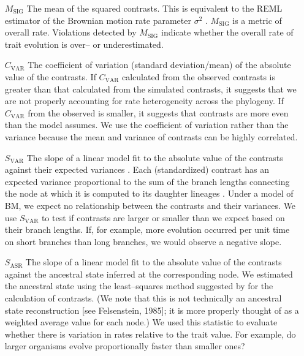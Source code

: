 \documentclass[a4paper,11pt]{article}
\begin{document}
\begin{enumerate}
\item[$M_{\text{SIG}}$] The mean of the squared contrasts. This is equivalent to the REML estimator of the Brownian motion rate parameter $\sigma^2$ \citep{Garland1992, Rohlf2001}. $M_{\text{SIG}}$ is a metric of overall rate. Violations detected by $M_{\text{SIG}}$ indicate whether the overall rate of trait evolution is over-- or underestimated.

\item[$C_{\text{VAR}}$] The coefficient of variation (standard deviation/mean) of the absolute value of the contrasts. If $C_{\text{VAR}}$ calculated from the observed contrasts is greater than that calculated from the simulated contrasts, it suggests that we are not properly accounting for rate heterogeneity across the phylogeny. If $C_{\text{VAR}}$ from the observed is smaller, it suggests that contrasts are more even than the model assumes. We use the coefficient of variation rather than the variance because the mean and variance of contrasts can be highly correlated.

\item[$S_{\text{VAR}}$] The slope of a linear model fit to the absolute value of the contrasts against their expected variances \citep[following][]{Garland1992}. Each (standardized) contrast has an expected variance proportional to the sum of the branch lengths connecting the node at which it is computed to its daughter lineages  \citep{Felsenstein1985}. Under a model of BM, we expect no relationship between the contrasts and their variances. We use $S_{\text{VAR}}$ to test if contrasts are larger or smaller than we expect based on their branch lengths. If, for example, more evolution occurred per unit time on short branches than long branches, we would observe a negative slope.

\item[$S_{\text{ASR}}$] The slope of a linear model fit to the absolute value of the contrasts against the ancestral state inferred at the corresponding node. We estimated the ancestral state using the least--squares method suggested by \citet{Felsenstein1985} for the calculation of contrasts. (We note that this is not technically an ancestral state reconstruction [see Felsenstein, 1985]; it is more properly thought of as a weighted average value for each node.) We used this statistic to evaluate whether there is variation in rates relative to the trait value. For example, do larger organisms evolve proportionally faster than smaller ones?


\end{enumerate}
\end{document}
